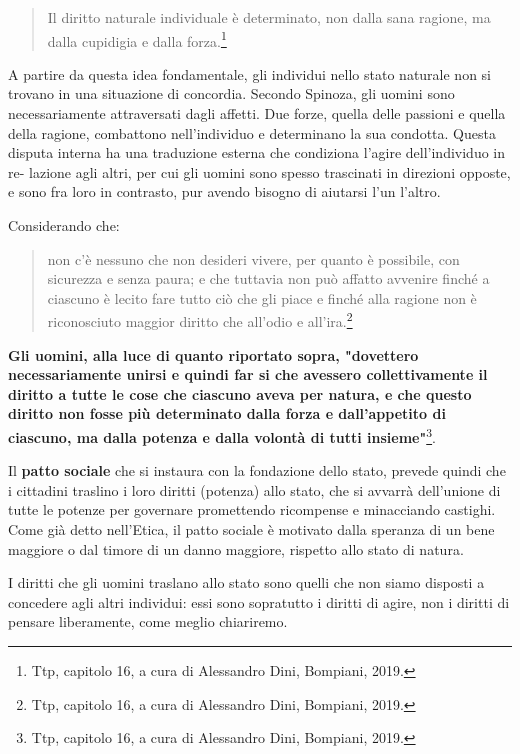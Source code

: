 \begin{quotation}
	\small 	Il diritto naturale individuale è determinato, non dalla
	sana ragione, ma dalla cupidigia e dalla forza.\footnote{Ttp, capitolo 16, a cura di Alessandro Dini, Bompiani, 2019.}
	
\end{quotation}

A partire da questa idea fondamentale, gli individui nello stato naturale non
si trovano in una situazione di concordia. Secondo Spinoza, gli uomini sono necessariamente attraversati dagli affetti. Due forze, quella delle passioni e quella della ragione, combattono nell’individuo e determinano la sua condotta. Questa disputa
interna ha una traduzione esterna che condiziona l’agire dell’individuo in re-
lazione agli altri, per cui gli uomini sono spesso trascinati in direzioni opposte, e sono fra loro
in contrasto, pur avendo bisogno di aiutarsi l’un l’altro.

Considerando che:
\begin{quotation}
	\small non c'è nessuno che non desideri vivere, per quanto è possibile, con sicurezza e senza paura; e che tuttavia non può affatto avvenire finché a ciascuno è lecito fare tutto ciò che gli piace e finché alla ragione non è riconosciuto maggior diritto che all'odio e all'ira.\footnote{Ttp, capitolo 16, a cura di Alessandro Dini, Bompiani, 2019.}
	
\end{quotation}

\textbf{Gli uomini, alla luce di quanto riportato sopra, "dovettero necessariamente unirsi e quindi far si che avessero collettivamente il diritto a tutte le cose che ciascuno aveva per natura, e che questo diritto non fosse più determinato dalla forza e dall'appetito di ciascuno, ma dalla potenza e dalla volontà di tutti insieme"}\footnote{Ttp, capitolo 16, a cura di Alessandro Dini, Bompiani, 2019.}.

Il \textbf{patto sociale} che si instaura con la fondazione dello stato, prevede quindi che i cittadini traslino i loro diritti (potenza) allo stato, che si avvarrà dell'unione di tutte le potenze per governare promettendo ricompense e minacciando castighi.
Come già detto nell'Etica, il patto sociale è motivato dalla speranza di un bene maggiore  o dal timore di un danno maggiore, rispetto allo stato di natura. 

I diritti che gli uomini traslano allo stato sono quelli che non siamo disposti a concedere agli altri individui: essi sono sopratutto i diritti di agire, non i diritti di pensare liberamente, come meglio chiariremo.

